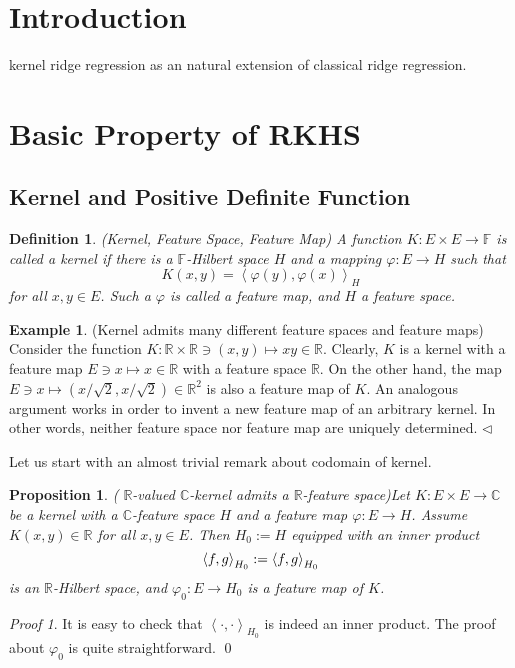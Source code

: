 \documentclass[a4paper,12pt]{article}
\newtheorem{prp}[thm]{Proposition}
\newtheorem{dfn}[thm]{Definition}
\theoremstyle{remark}
\newtheorem*{prf}{Proof}
\theoremstyle{definition}
\theoremstyle{definition}
\newtheorem{ex}[thm]{Example}
\theoremstyle{definition}
\newcommand{\ip}[2]{\left<#1, #2 \right>}
\newcommand{\fin}{\hfill \( \triangleleft \) }
\let\Re\relax
\DeclareMathOperator{\Re}{Re}
\begin{document}
\section{Introduction}
kernel ridge regression as an natural extension of classical ridge regression.
\section{Basic Property of RKHS}
\subsection{Kernel and Positive Definite Function}
\begin{dfn} (Kernel, Feature Space, Feature Map)
	A function \( K:E \times E \to \mathbb{F} \) is called a kernel if there is a \( \mathbb{F}\)-Hilbert space \( H \) and a mapping \( \varphi:E \to H \) such that
	\begin{equation*}
		K(x,y) = \ip{\varphi(y)}{\varphi(x)}_H
	\end{equation*}
	for all \( x,y \in E \).
	Such a \( \varphi \) is called a feature map, and \( H \) a feature space.
\end{dfn}

\begin{ex}(Kernel admits many different feature spaces and feature maps)
	Consider the function \( K:\mathbb{R} \times \mathbb{R} \ni (x,y) \mapsto xy \in \mathbb{R} \). Clearly, \( K \) is a kernel with a feature map \( E \ni x \mapsto x \in \mathbb{R} \) with a feature space \( \mathbb{R} \). On the other hand, the map \( E \ni x \mapsto (x / \sqrt{2}, x / \sqrt{2}) \in \mathbb{R}^2 \) is also a feature map of \( K \). An analogous argument works in order to invent a new feature map of an arbitrary kernel. In other words, neither feature space nor feature map are uniquely determined.
	\fin\end{ex}

Let us start with an almost trivial remark about codomain of kernel.
\begin{prp} ( \( \mathbb{R} \)-valued \( \mathbb{C} \)-kernel admits a \( \mathbb{R} \)-feature space)\label{R-valued C-kernel admits a R-feature space}
	Let \( K:E \times E \to \mathbb{C} \) be a kernel with a \( \mathbb{C} \)-feature space \( H \) and a feature map \( \varphi:E \to H \). Assume \( K(x,y)\in \mathbb{R} \) for all \( x,y \in E \). Then \( H_0 := H \) equipped with an inner product
	\begin{equation*}
		\ip{f}{g}_{H_0} := \Re \ip{f}{g}_{H_0}
	\end{equation*}
	is an \( \mathbb{R} \)-Hilbert space, and \( \varphi_0:E \to H_0 \) is a feature map of \( K \).
\end{prp}
\begin{prf}
	It is easy to check that \( \ip{\cdot }{\cdot }_{H_0} \) is indeed an inner product. The proof about \( \varphi_0 \) is quite straightforward.
	\qed\end{prf}
\end{document}
